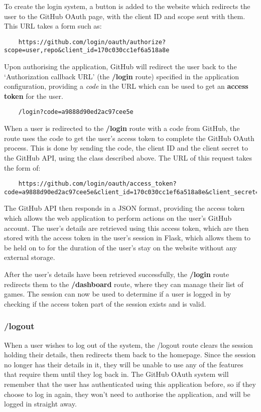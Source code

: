 	To create the login system, a button is added to the website which redirects the user to the GitHub OAuth page, with the client ID and scope sent with them. This URL takes a form such as:

	\begin{lstlisting}
	https://github.com/login/oauth/authorize?scope=user,repo&client_id=170c030cc1ef6a518a8e\end{lstlisting}

	Upon authorising the application, GitHub will redirect the user back to the `Authorization callback URL' (the \textbf{/login} route) specified in the application configuration, providing a \emph{code} in the URL which can be used to get an \textbf{access token} for the user.

	\begin{lstlisting}
	/login?code=a9888d90ed2ac97cee5e\end{lstlisting}

	When a user is redirected to the \textbf{/login} route with a code from GitHub, the route uses the code to get the user's access token to complete the GitHub OAuth process. This is done by sending the code, the client ID and the client secret to the GitHub API, using the class described above. The URL of this request takes the form of:

	\begin{lstlisting}
	https://github.com/login/oauth/access_token?code=a9888d90ed2ac97cee5e&client_id=170c030cc1ef6a518a8e&client_secret=3oeqft9w9zd536m0oxar\end{lstlisting}

	The GitHub API then responds in a JSON format, providing the access token which allows the web application to perform actions on the user's GitHub account. The user's details are retrieved using this access token, which are then stored with the access token in the user's session in Flask, which allows them to be held on to for the duration of the user's stay on the website without any external storage. 

	After the user's details have been retrieved successfully, the \textbf{/login} route redirects them to the \textbf{/dashboard} route, where they can manage their list of games. The session can now be used to determine if a user is logged in by checking if the access token part of the session exists and is valid.

	\subsubsection{/logout}
	When a user wishes to log out of the system, the /logout route clears the session holding their details, then redirects them back to the homepage. Since the session no longer has their details in it, they will be unable to use any of the features that require them until they log back in. The GitHub OAuth system will remember that the user has authenticated using this application before, so if they choose to log in again, they won't need to authorise the application, and will be logged in straight away.

